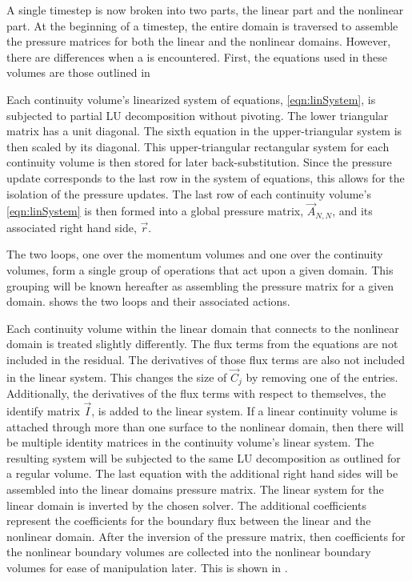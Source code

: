 A single timestep is now broken into two parts, the linear part and the nonlinear part.
At the beginning of a timestep, the entire domain is traversed to assemble the pressure matrices for both the linear and the nonlinear domains.
However, there are differences when a  is encountered.
First, the equations used in these volumes are those outlined in 

Each continuity volume's linearized system of equations, \eqref{eqn:linSystem}, is subjected to partial LU decomposition without pivoting.
The lower triangular matrix has a unit diagonal.
The sixth equation in the upper-triangular system is then scaled by its diagonal.
This upper-triangular rectangular system for each continuity volume is then stored for later back-substitution.
Since the pressure update corresponds to the last row in the system of equations, this allows for the isolation of the pressure updates.
The last row of each continuity volume's \eqref{eqn:linSystem} is then formed into a global pressure matrix, $\vec{A}_{N,N}$, and its associated right hand side, $\vec{r}$.

The two loops, one over the momentum volumes and one over the continuity volumes, form a single group of operations that act upon a given domain.
This grouping will be known hereafter as assembling the pressure matrix for a given domain.
 shows the two loops and their associated actions.


Each continuity volume within the linear domain that connects to the nonlinear domain is treated slightly differently.
The flux terms from the equations are not included in the residual.
The derivatives of those flux terms are also not included in the linear system.
This changes the size of $\vec{C}_{j}$ by removing one of the entries.
Additionally, the derivatives of the flux terms with respect to themselves, the identify matrix $\vec{I}$, is added to the linear system.
If a linear continuity volume is attached through more than one surface to the nonlinear domain, then there will be multiple identity matrices in the continuity volume's linear system.
The resulting system will be subjected to the same LU decomposition as outlined for a regular volume.
The last equation with the additional right hand sides will be assembled into the linear domains pressure matrix.
The linear system for the linear domain is inverted by the chosen solver.
The additional coefficients represent the coefficients for the boundary flux between the linear and the nonlinear domain.
After the inversion of the pressure matrix, then coefficients for the nonlinear boundary volumes are collected into the nonlinear boundary volumes for ease of manipulation later.
This is shown in .


